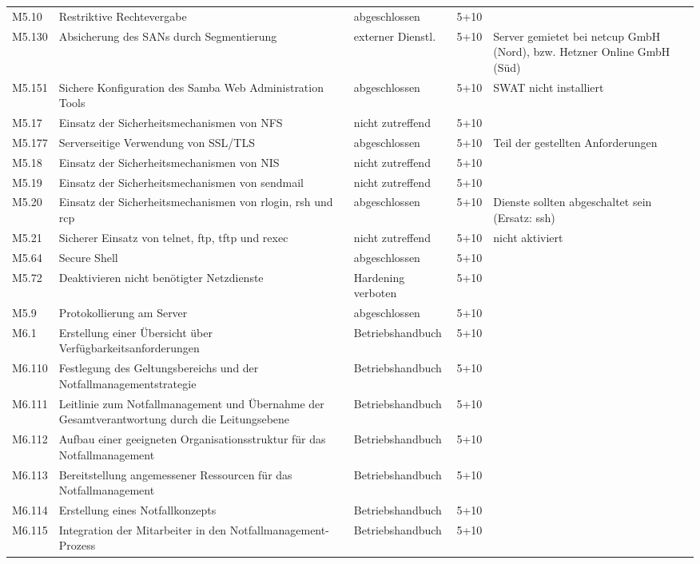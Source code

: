 \begin{longtable}{lp{3.7cm}p{3cm}lp{3.8cm}}
M5.10 & Restriktive Rechtevergabe & abgeschlossen & 5+10 &  \\
M5.130 & Absicherung des SANs durch Segmentierung & externer Dienstl. & 5+10 & Server gemietet bei netcup GmbH (Nord), bzw. Hetzner Online GmbH (Süd) \\
M5.151 & Sichere Konfiguration des Samba Web Administration Tools & abgeschlossen & 5+10 & SWAT nicht installiert \\
M5.17 & Einsatz der Sicherheitsmechanismen von NFS & nicht zutreffend & 5+10 &  \\
M5.177 & Serverseitige Verwendung von SSL/TLS & abgeschlossen & 5+10 & Teil der gestellten Anforderungen \\
M5.18 & Einsatz der Sicherheitsmechanismen von NIS & nicht zutreffend & 5+10 &  \\
M5.19 & Einsatz der Sicherheitsmechanismen von sendmail & nicht zutreffend & 5+10 &  \\
M5.20 & Einsatz der Sicherheitsmechanismen von rlogin, rsh und rcp & abgeschlossen & 5+10 & Dienste sollten abgeschaltet sein (Ersatz: ssh) \\
M5.21 & Sicherer Einsatz von telnet, ftp, tftp und rexec & nicht zutreffend & 5+10 & nicht aktiviert \\
M5.64 & Secure Shell & abgeschlossen & 5+10 &  \\
M5.72 & Deaktivieren nicht benötigter Netzdienste & Hardening verboten & 5+10 &  \\
M5.9 & Protokollierung am Server & abgeschlossen & 5+10 &  \\
M6.1 & Erstellung einer Übersicht über Verfügbarkeitsanforderungen & Betriebshandbuch & 5+10 &  \\
M6.110 & Festlegung des Geltungsbereichs und der Notfallmanagementstrategie & Betriebshandbuch & 5+10 &  \\
M6.111 & Leitlinie zum Notfallmanagement und Übernahme der Gesamtverantwortung durch die Leitungsebene & Betriebshandbuch & 5+10 &  \\
M6.112 & Aufbau einer geeigneten Organisationsstruktur für das Notfallmanagement & Betriebshandbuch & 5+10 &  \\
M6.113 & Bereitstellung angemessener Ressourcen für das Notfallmanagement & Betriebshandbuch & 5+10 &  \\
M6.114 & Erstellung eines Notfallkonzepts & Betriebshandbuch & 5+10 &  \\
M6.115 & Integration der Mitarbeiter in den Notfallmanagement-Prozess & Betriebshandbuch & 5+10 &  \\

\end{longtable}
